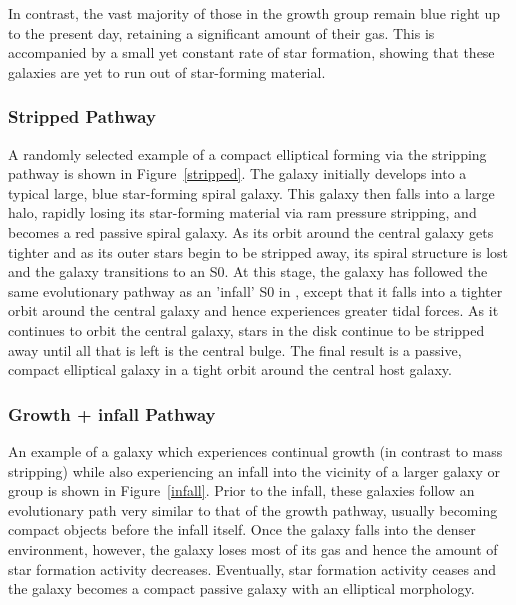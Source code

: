 \documentclass[a4paper,fleqn,usenatbib]{mnras}
\begin{document}
In contrast, the vast majority of those in the growth group remain blue right up to the present day, retaining a significant amount of their gas. This is accompanied by a small yet constant rate of star formation, showing that these galaxies are yet to run out of star-forming material. 


\subsubsection{Stripped Pathway}

A randomly selected example of a compact elliptical forming via the stripping pathway is shown in Figure~\ref{stripped}. The galaxy initially develops into a typical large, blue star-forming spiral galaxy. This galaxy then falls into a large halo, rapidly losing its star-forming material via ram pressure stripping, and becomes a red passive spiral galaxy. As its orbit around the central galaxy gets tighter and as its outer stars begin to be stripped away, its spiral structure is lost and the galaxy transitions to an S0. At this stage, the galaxy has followed the same evolutionary pathway as an 'infall' S0 in \citet{2021MNRAS.508..895D}, except that it falls into a tighter orbit around the central galaxy and hence experiences greater tidal forces. As it continues to orbit the central galaxy, stars in the disk continue to be stripped away until all that is left is the central bulge. The final result is a passive, compact elliptical galaxy in a tight orbit around the central host galaxy. 



\subsubsection{Growth + infall Pathway}

An example of a galaxy which experiences continual growth (in contrast to mass stripping) while also experiencing an infall into the vicinity of a larger galaxy or group is shown in Figure~\ref{infall}. Prior to the infall, these galaxies follow an evolutionary path very similar to that of the growth pathway, usually becoming compact objects before the infall itself. Once the galaxy falls into the denser environment, however, the galaxy loses most of its gas and hence the amount of star formation activity decreases. Eventually, star formation activity ceases and the galaxy becomes a compact passive galaxy with an elliptical morphology. 
\end{document}
